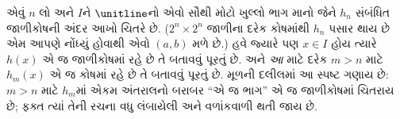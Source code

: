 એવું $n$ લો અને
$I$ને $\unitline$નો
એવો સૌથી મોટો
ખુલ્લો ભાગ માનો
જેને $h_n$ સંબંધિત
જાળીકોષની અંદર
આખો ચિતરે છે.
($2^n\times 2^n$
જાળીના દરેક કોષમાંથી
$h_n$ પસાર થાય
છે એમ આપણે
નોંધ્યું હોવાથી
એવો $(a,b)$
મળે છે.) હવે
જ્યારે પણ $x \in I$
હોય ત્યારે $h(x)$
એ જ જાળીકોષમાં
રહે છે તે બતાવવું
પૂરતું છે. અને
\emph{આ} માટે
દરેક $m > n$
માટે $h_m(x)$
એ જ કોષમાં
રહે છે તે
બતાવવું પૂરતું છે.
મૂળની દલીલમાં
આ સ્પષ્ટ ગણાય છે:
$m > n$ માટે
$h_m$માં એકમ
અંતરાલનો બરાબર
“એ જ ભાગ”
એ જ જાળીકોષમાં
ચિતરાય છે;
ફક્ત ત્યાં તેની
રચના વધુ લંબાયેલી
અને વળાંકવાળી
થતી જાય છે.
\endgroup
\endgroup


\OLEndPartHook
